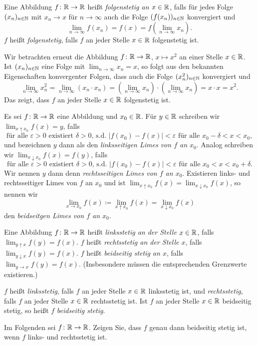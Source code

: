 \documentclass[a4paper,10pt]{article}
\begin{document}
\begin{defi}
 Eine Abbildung $f \colon \mathbb{R} \to \mathbb{R}$ heißt \emph{folgenstetig an $x \in \mathbb{R}$}, falls für jedes Folge $(x_n)_{n \in \mathbb{N}}$ mit $x_n \to x$ für $n \to \infty$ auch die Folge $(f(x_n))_{n \in \mathbb{N}}$ konvergiert und
 \[
  \lim_{n \to \infty} f(x_n) = f(x) = f\left(\lim_{n \to \infty} x_n\right).
 \]
 $f$ heißt \emph{folgenstetig}, falls $f$ an jeder Stelle $x \in \mathbb{R}$ folgenstetig ist.
\end{defi}


\begin{bsp}
 Wir betrachten erneut die Abbildung $f \colon \mathbb{R} \to \mathbb{R}$, $x \mapsto x^2$ an einer Stelle $x \in \mathbb{R}$. Ist $(x_n)_{n \in \mathbb{N}}$ eine Folge mit $\lim_{n \to \infty} x_n = x$, so folgt aus den bekannten Eigenschaften konvergenter Folgen, dass auch die Folge $(x_n^2)_{n \in \mathbb{N}}$ konvergiert und
 \[
  \lim_{n \to \infty} x_n^2
  = \lim_{n \to \infty} (x_n \cdot x_n)
  = \left(\lim_{n \to \infty} x_n\right) \cdot \left(\lim_{n \to \infty} x_n\right)
  = x \cdot x
  = x^2.
 \]
 Das zeigt, dass $f$ an jeder Stelle $x \in \mathbb{R}$ folgenstetig ist.
\end{bsp}


\begin{defi}
 Es sei $f \colon \mathbb{R} \to \mathbb{R}$ eine Abbildung und $x_0 \in \mathbb{R}$. Für $y \in \mathbb{R}$ schreiben wir $\lim_{x \uparrow x_0} f(x) = y$, falls
 \[
  \text{für alle $\varepsilon > 0$ existiert $\delta > 0$, s.d.\ $|f(x_0)-f(x)| < \varepsilon$ für alle $x_0-\delta < x < x_0$},
 \]
 und bezeichnen $y$ dann als den \emph{linksseitigen Limes von $f$ an $x_0$}. Analog schreiben wir \mbox{$\lim_{x \downarrow x_0} f(x) = f(y)$}, falls
 \[
  \text{für alle $\varepsilon > 0$ existiert $\delta > 0$, s.d.\ $|f(x_0)-f(x)| < \varepsilon$ für alle $x_0 < x < x_0+\delta$}.
 \]
 Wir nennen $y$ dann denn \emph{rechtsseitigen Limes von $f$ an $x_0$}. Existieren links- und rechtsseitiger Limes von $f$ an $x_0$ und ist $\lim_{x \uparrow x_0} f(x) = \lim_{x \downarrow x_0} f(x)$, so nennen wir
 \[
  \lim_{x \to x_0} f(x) \coloneqq \lim_{x \uparrow x_0} f(x) = \lim_{x \downarrow x_0} f(x)
 \]
 den \emph{beidseitgen Limes von $f$ an $x_0$}.
\end{defi}


\begin{defi}
 Eine Abbildung $f \colon \mathbb{R} \to \mathbb{R}$ heißt \emph{linksstetig an der Stelle $x \in \mathbb{R}$}, falls $\lim_{y \uparrow x} f(y) = f(x)$. $f$ heißt \emph{rechtsstetig an der Stelle $x$}, falls $\lim_{y \downarrow x} f(y) = f(x)$. $f$ heißt \emph{beidseitig stetig an $x$}, falls $\lim_{y \to x} f(y) = f(x)$. (Insbesondere müssen die entsprechenden Grenzwerte existieren.)
 
 $f$ heißt \emph{linksstetig}, falls $f$ an jeder Stelle $x \in \mathbb{R}$ linksstetig ist, und \emph{rechtsstetig}, falls $f$ an jeder Stelle $x \in \mathbb{R}$ rechtsstetig ist. Ist $f$ an jeder Stelle $x \in \mathbb{R}$ beidseitig stetig, so heißt $f$ \emph{beidseitig stetig}.
\end{defi}

\begin{ExerciseList}
 Im Folgenden sei $f \colon \mathbb{R} \to \mathbb{R}$.
 \Exercise
  Zeigen Sie, dass $f$ genau dann beidseitig stetig ist, wenn $f$ links- und rechtsstetig ist.
\end{ExerciseList}
\end{document}
